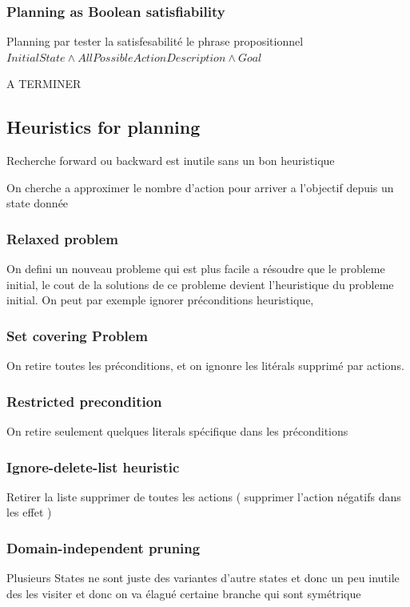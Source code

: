 		\subsubsection{Planning as Boolean satisfiability}
			Planning par tester la satisfesabilité le phrase propositionnel $InitialState \land AllPossibleActionDescription \land Goal$
			
			A TERMINER
			
	\subsection{Heuristics for planning}
	
		Recherche forward ou backward est inutile sans un bon heuristique
		
		On cherche a approximer le nombre d'action pour arriver a l'objectif depuis un state donnée
		
		\subsubsection{Relaxed problem}
			On defini un nouveau probleme qui est plus facile a résoudre que le probleme initial, le cout de la solutions de ce probleme devient l'heuristique du probleme initial. On peut par exemple ignorer préconditions heuristique, 
		
		\subsubsection{Set covering Problem}
		
		On retire toutes les préconditions, et on ignonre les litérals supprimé par actions.
		
		\subsubsection{Restricted precondition}
		On retire seulement quelques literals spécifique dans les préconditions
		
		\subsubsection{Ignore-delete-list heuristic}
		Retirer la liste supprimer de toutes les actions ( supprimer l'action négatifs dans les effet )
		
		\subsubsection{Domain-independent pruning}
		Plusieurs States ne sont juste des variantes d'autre states et donc un peu inutile des les visiter et donc on va élagué certaine branche qui sont symétrique
			